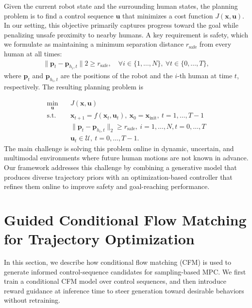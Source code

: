 \documentclass[letterpaper,10 pt,conference]{ieeeconf}
\begin{document}
Given the current robot state and the surrounding human states, the planning problem is to find a control sequence $\mathbf{u}$ that minimizes a cost function $J(\mathbf{x}, \mathbf{u})$. 
In our setting, this objective primarily captures progress toward the goal while penalizing unsafe proximity to nearby humans. 
A key requirement is safety, which we formulate as maintaining a minimum separation distance $r_{\mathrm{safe}}$ from every human at all times:
\begin{align}
\|\mathbf{p}_t - \mathbf{p}_{h_i,t}\|2 \ge r_{\mathrm{safe}},
\quad \forall i \in \{1,\ldots,N\},\ \forall t \in \{0,\ldots,T\},
\end{align}
where $\mathbf{p}_t$ and $\mathbf{p}_{h_i, t}$ are the positions of the robot and the $i$-th human at time $t$, respectively.
The resulting planning problem is

\vspace{-3mm}
{\small
\begin{equation}
\begin{aligned}
\min_{\mathbf{u}} & \quad J(\mathbf{x}, \mathbf{u}) \\
\text{s.t.} & \quad \mathbf{x}_{t+1}=f(\mathbf{x}_t, \mathbf{u}_t), \: \mathbf{x}_0 = \mathbf{x}_{\text{init}}, \:  t=1,\ldots,T-1\\
& \quad \|\mathbf{p}_t-\mathbf{p}_{h_i, t}\|_2 \geq r_{\text{safe}}, \:  i =1,\ldots,N, t=0,\ldots,T \label{eq:safe_const}\\
& \quad \mathbf{u}_t \in \mathcal{U}, \: t=0,\ldots,T-1.
\end{aligned}
\end{equation}
}
The main challenge is solving this problem online in dynamic, uncertain, and multimodal environments where future human motions are not known in advance. 
Our framework addresses this challenge by combining a generative model that produces diverse trajectory priors with an optimization-based controller that refines them online to improve safety and goal-reaching performance.


\section{Guided Conditional Flow Matching for Trajectory Optimization} \label{sec:guided flow matching}

In this section, we describe how conditional flow matching (CFM) is used to generate informed control-sequence candidates for sampling-based MPC. 
We first train a conditional CFM model over control sequences, and then introduce reward guidance at inference time to steer generation toward desirable behaviors without retraining.
\end{document}
